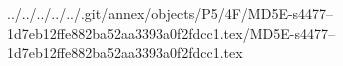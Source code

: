 ../../../../../.git/annex/objects/P5/4F/MD5E-s4477--1d7eb12ffe882ba52aa3393a0f2fdcc1.tex/MD5E-s4477--1d7eb12ffe882ba52aa3393a0f2fdcc1.tex